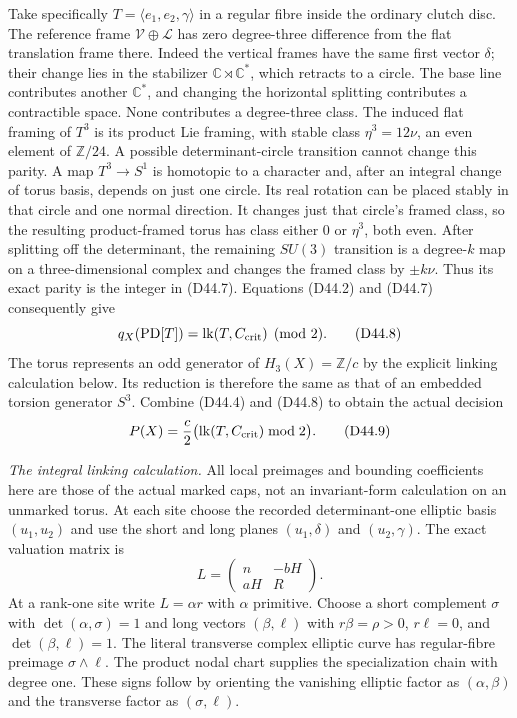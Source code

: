 Take specifically $T=\langle e_1,e_2,\gamma\rangle$ in a regular
fibre inside the ordinary clutch disc. The reference frame
$\mathcal V\oplus\mathcal L$ has zero degree-three difference
from the flat translation frame there. Indeed the vertical
frames have the same first vector $\delta$; their change lies
in the stabilizer $\mathbb C\rtimes\mathbb C^*$, which retracts
to a circle. The base line contributes another $\mathbb C^*$,
and changing the horizontal splitting contributes a contractible
space. None contributes a degree-three class. The induced flat
framing of $T^3$ is its product Lie framing, with stable class
$\eta^3=12\nu$, an even element of $\mathbb Z/24$.
A possible determinant-circle transition cannot change this
parity. A map $T^3\to S^1$ is homotopic to a character and,
after an integral change of torus basis, depends on just one
circle. Its real rotation can be placed stably in that circle
and one normal direction. It changes just that circle's framed
class, so the resulting product-framed torus has class either
$0$ or $\eta^3$, both even. After splitting off the determinant,
the remaining $SU(3)$ transition is a degree-$k$ map on a
three-dimensional complex and changes the framed class by
$\pm k\nu$. Thus its exact parity is the integer in (D44.7).
Equations (D44.2) and (D44.7) consequently give
\[
 q_X(\operatorname{PD}[T])
       =\operatorname{lk}(T,C_{\rm crit})\pmod2.              \tag{D44.8}
\]
The torus represents an odd generator of $H_3(X)=\mathbb Z/c$
by the explicit linking calculation below. Its reduction is
therefore the same as that of an embedded torsion generator
$S^3$. Combine (D44.4) and (D44.8) to obtain the actual decision
\[
 P(X)=\frac c2
       \bigl(\operatorname{lk}(T,C_{\rm crit})\bmod2\bigr).
                                                               \tag{D44.9}
\]

\emph{The integral linking calculation.}
All local preimages and bounding coefficients here are those
of the actual marked caps, not an invariant-form calculation
on an unmarked torus. At each site choose the recorded
determinant-one elliptic basis $(u_1,u_2)$ and use the short
and long planes $(u_1,\delta)$ and $(u_2,\gamma)$. The exact
valuation matrix is
\[
 L=\begin{pmatrix}n&-bH\\aH&R\end{pmatrix}.                  \tag{D44.10}
\]
At a rank-one site write $L=\alpha r$ with $\alpha$ primitive.
Choose a short complement $\sigma$ with
$\det(\alpha,\sigma)=1$ and long vectors $(\beta,\ell)$ with
$r\beta=\rho>0$, $r\ell=0$, and $\det(\beta,\ell)=1$.
The literal transverse complex elliptic curve has regular-fibre
preimage $\sigma\wedge\ell$. The product nodal chart supplies
the specialization chain with degree one. These signs follow
by orienting the vanishing elliptic factor as $(\alpha,\beta)$
and the transverse factor as $(\sigma,\ell)$.


